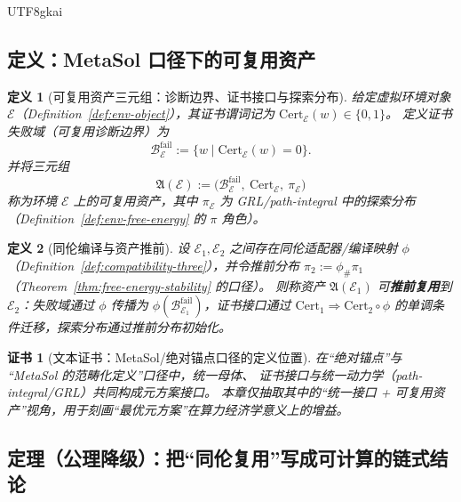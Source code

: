 \documentclass[12pt]{article}
\newtheorem{definition}{定义}[section]
\newtheorem{certificate}{证书}[section]
\begin{document}
\begin{CJK*}{UTF8}{gkai}
\subsection{定义：\textsf{MetaSol} 口径下的可复用资产}

\begin{definition}[可复用资产三元组：诊断边界、证书接口与探索分布]
\label{def:reusable-asset-triple}
给定虚拟环境对象 $\mathcal{E}$（Definition~\ref{def:env-object}），其证书谓词记为 $\mathrm{Cert}_{\mathcal{E}}(w)\in\{0,1\}$。
定义证书失败域（可复用诊断边界）为
\[
\mathcal{B}_{\mathcal{E}}^{\mathrm{fail}}
:=
\{w\mid \mathrm{Cert}_{\mathcal{E}}(w)=0\}.
\]
并将三元组
\[
\mathfrak{A}(\mathcal{E})
:=
\bigl(\mathcal{B}_{\mathcal{E}}^{\mathrm{fail}},\ \mathrm{Cert}_{\mathcal{E}},\ \pi_{\mathcal{E}}\bigr)
\]
称为环境 $\mathcal{E}$ 上的可复用资产，其中 $\pi_{\mathcal{E}}$ 为 GRL/path-integral 中的探索分布（Definition~\ref{def:env-free-energy} 的
  $\pi$ 角色）。
\end{definition}

\begin{definition}[同伦编译与资产推前]
\label{def:asset-pushforward}
设 $\mathcal{E}_1,\mathcal{E}_2$ 之间存在同伦适配器/编译映射 $\phi$（Definition~\ref{def:compatibility-three}），并令推前分布 $\pi_2:=\phi_{\#}
  \pi_1$（Theorem~\ref{thm:free-energy-stability} 的口径）。
则称资产 $\mathfrak{A}(\mathcal{E}_1)$ 可\textbf{推前复用}到 $\mathcal{E}_2$：失败域通过 $\phi$ 传播为 $\phi(\mathcal{B}_{\mathcal{E}_1}
  ^{\mathrm{fail}})$，证书接口通过 $\mathrm{Cert}_1\Rightarrow \mathrm{Cert}_2\circ\phi$ 的单调条件迁移，探索分布通过推前分布初始化。
\end{definition}

\begin{certificate}[文本证书：\textsf{MetaSol}/绝对锚点口径的定义位置]
\label{cert:tex14-metasol-source}
在“绝对锚点”与 “MetaSol 的范畴化定义”口径中，统一母体、
  证书接口与统一动力学（path-integral/GRL）共同构成元方案接口。
本章仅抽取其中的“统一接口 + 可复用资产”视角，用于刻画“最优元方案”在算力经济学意义上的增益。
\end{certificate}

\subsection{定理（公理降级）：把“同伦复用”写成可计算的链式结论}


\end{CJK*}
\end{document}

